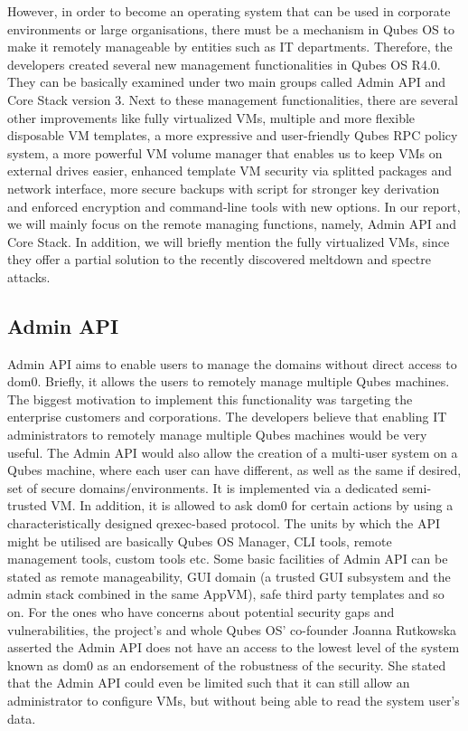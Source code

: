 \documentclass[runningheads,a4paper]{article}
\begin{document}
However, in order to become an operating system that can be used in
corporate environments or large organisations, there must be a
mechanism in Qubes OS to make it remotely manageable by entities such
as IT departments.  Therefore, the developers created several new
management functionalities in Qubes OS R4.0. They can be basically
examined under two main groups called Admin API and Core Stack version 3. Next
to these management functionalities, there are several other
improvements like fully virtualized VMs, multiple and more flexible
disposable VM templates, a more expressive and user-friendly Qubes RPC
policy system, a more powerful VM volume manager that enables us to
keep VMs on external drives easier, enhanced template VM security via
splitted packages and network interface, more secure backups with
script for stronger key derivation and enforced encryption and
command-line tools with new options. In our report, we will mainly
focus on the remote managing functions, namely, Admin API and Core
Stack. In addition, we will briefly mention the fully virtualized VMs,
since they offer a partial solution to the recently discovered
meltdown and spectre attacks.

\subsection{Admin API} 

Admin API aims to enable users to manage the
domains without direct access to dom0. Briefly, it allows the users to
remotely manage multiple Qubes machines.  The biggest motivation to
implement this functionality was targeting the enterprise customers
and corporations. The developers believe that enabling IT
administrators to remotely manage multiple Qubes machines would be
very useful.  The Admin API would also allow the creation of a
multi-user system on a Qubes machine, where each user can have
different, as well as the same if desired, set of secure
domains/environments.  It is implemented via a dedicated semi-trusted
VM. In addition, it is allowed to ask dom0 for certain actions by
using a characteristically designed qrexec-based protocol.  The units
by which the API might be utilised are basically Qubes OS Manager, CLI
tools, remote management tools, custom tools etc. Some basic
facilities of Admin API can be stated as remote manageability, GUI
domain (a trusted GUI subsystem and the admin stack combined in the
same AppVM), safe third party templates and so on. For the ones who
have concerns about potential security gaps and vulnerabilities, the
project's and whole Qubes OS' co-founder Joanna Rutkowska asserted the
Admin API does not have an access to the lowest level of the system
known as dom0 as an endorsement of the robustness of the security. She
stated that the Admin API could even be limited such that it can still
allow an administrator to configure VMs, but without being able to
read the system user's data.
\end{document}

